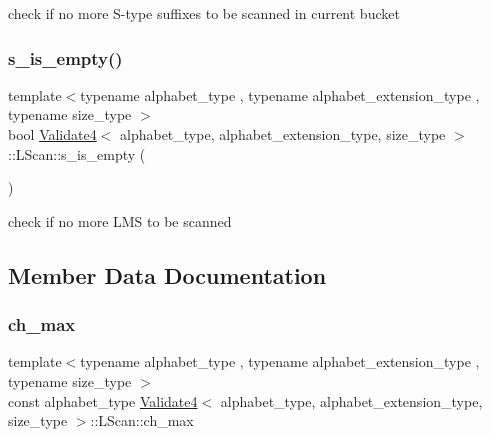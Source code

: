 check if no more S-\/type suffixes to be scanned in current bucket 

\mbox{\label{struct_validate4_1_1_l_scan_a071826b788f5aadc92f87ad8cc986649}} 
\subsubsection{\texorpdfstring{s\+\_\+is\+\_\+empty()}{s\_is\_empty()}}
{\footnotesize\ttfamily template$<$typename alphabet\+\_\+type , typename alphabet\+\_\+extension\+\_\+type , typename size\+\_\+type $>$ \\
bool \hyperlink{class_validate4}{Validate4}$<$ alphabet\+\_\+type, alphabet\+\_\+extension\+\_\+type, size\+\_\+type $>$\+::L\+Scan\+::s\+\_\+is\+\_\+empty (\begin{DoxyParamCaption}{ }\end{DoxyParamCaption})\hspace{0.3cm}{\ttfamily [inline]}}



check if no more L\+MS to be scanned 



\subsection{Member Data Documentation}
\mbox{\label{struct_validate4_1_1_l_scan_a907234b2fa774b42e87050f0066e26b6}} 
\subsubsection{\texorpdfstring{ch\+\_\+max}{ch\_max}}
{\footnotesize\ttfamily template$<$typename alphabet\+\_\+type , typename alphabet\+\_\+extension\+\_\+type , typename size\+\_\+type $>$ \\
const alphabet\+\_\+type \hyperlink{class_validate4}{Validate4}$<$ alphabet\+\_\+type, alphabet\+\_\+extension\+\_\+type, size\+\_\+type $>$\+::L\+Scan\+::ch\+\_\+max\hspace{0.3cm}{\ttfamily [private]}}



